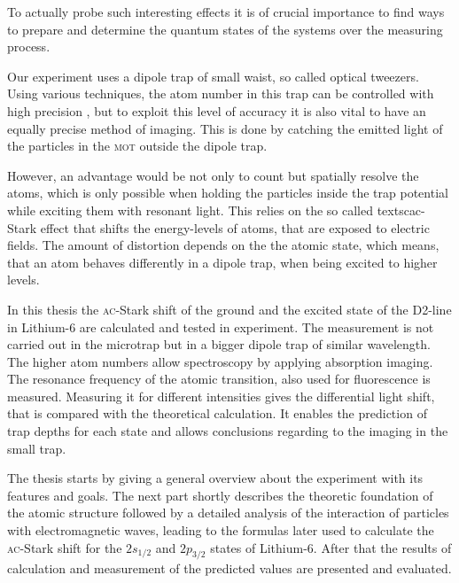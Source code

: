 To actually probe such interesting effects it is of crucial importance to find ways to prepare and determine the quantum states of the systems over the measuring process.

Our experiment uses a dipole trap of small waist, so called optical tweezers. Using various techniques, the atom number in this trap can be controlled with high precision \cite{preparation}, but to exploit this level of accuracy it is also vital to have an equally precise method of imaging. This is done by catching the emitted light of the particles in the \textsc{mot} outside the dipole trap.

However, an advantage would be not only to count but spatially resolve the atoms, which is only possible when holding the particles inside the trap potential while exciting them with resonant light. This relies on the so called textsc{ac}-Stark effect that shifts the energy-levels of atoms, that are exposed to electric fields. The amount of distortion depends on the the atomic state, which means, that an atom behaves differently in a dipole trap, when being excited to higher levels.

In this thesis the \textsc{ac}-Stark shift of the ground and the excited state of the D2-line in Lithium-6 are calculated and tested in experiment. The measurement is not carried out in the microtrap but in a bigger dipole trap of similar wavelength. The higher atom numbers allow spectroscopy by applying absorption imaging. The resonance frequency of the atomic transition, also used for fluorescence is measured. Measuring it for different intensities gives the differential light shift, that is compared with the theoretical calculation. It enables the prediction of trap depths for each state and allows conclusions regarding to the imaging in the small trap. 

The thesis starts by giving a general overview about the experiment with its features and goals. The next part shortly describes the theoretic foundation of the atomic structure followed by a detailed analysis of the interaction of particles with electromagnetic waves, leading to the formulas later used to calculate the \textsc{ac}-Stark shift for the $2s_{1/2}$ and $2p_{3/2}$ states of Lithium-6. After that the results of calculation and measurement of the predicted values are presented and evaluated.

